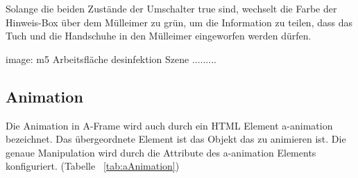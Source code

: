  Solange die beiden Zustände der Umschalter {\selectfont true} sind, wechselt die Farbe der Hinweis-Box über dem Mülleimer zu grün, um die Information zu teilen, dass das Tuch und die Handschuhe in den Mülleimer eingeworfen werden dürfen.
 
 image: m5 Arbeitsfläche desinfektion Szene .........
 
 \subsection{Animation}
 Die Animation in A-Frame wird auch durch ein HTML Element {\selectfont a-animation} bezeichnet. Das übergeordnete Element ist das Objekt das zu animieren ist. Die genaue Manipulation wird durch die Attribute des {\selectfont a-animation} Elements konfiguriert. (Tabelle ~\ref{tab:aAnimation})
 
